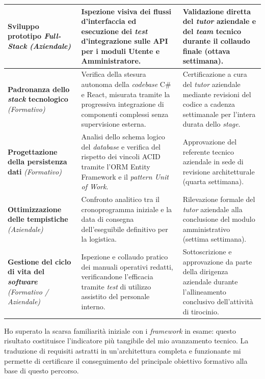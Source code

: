 {\begin{longtable}{p{} p{} p{}}
    \textbf{Sviluppo prototipo \textit{Full-Stack}} \newline \textit{(Aziendale)} & 
    Ispezione visiva dei flussi d'interfaccia ed esecuzione dei \textit{test} d'integrazione sulle API per i moduli Utente e Amministratore. & 
    Validazione diretta del \textit{tutor} aziendale e del \textit{team} tecnico durante il collaudo finale (ottava settimana). \\
    \hline
    \textbf{Padronanza dello \textit{stack} tecnologico} \newline \textit{(Formativo)} & 
    Verifica della stesura autonoma della \textit{codebase} C\# e React, misurata tramite la progressiva integrazione di componenti complessi senza supervisione esterna. & 
    Certificazione a cura del \textit{tutor} aziendale mediante revisioni del codice a cadenza settimanale per l'intera durata dello \textit{stage}. \\
    \hline
    \textbf{Progettazione della persistenza dati} \newline \textit{(Formativo)} & 
    Analisi dello schema logico del \textit{database} e verifica del rispetto dei vincoli ACID tramite l'ORM Entity Framework e il \textit{pattern Unit of Work}. & 
    Approvazione del referente tecnico aziendale in sede di revisione architetturale (quarta settimana). \\
    \hline
    \textbf{Ottimizzazione delle tempistiche} \newline \textit{(Aziendale)} & 
    Confronto analitico tra il cronoprogramma iniziale e la data di consegna dell'eseguibile definitivo per la logistica. & 
    Rilevazione formale del \textit{tutor} aziendale alla conclusione del modulo amministrativo (settima settimana). \\
    \hline
    \textbf{Gestione del ciclo di vita del \textit{software}} \newline \textit{(Formativo / Aziendale)} & 
    Ispezione e collaudo pratico dei manuali operativi redatti, verificandone l'efficacia tramite \textit{test} di utilizzo assistito del personale interno. & 
    Sottoscrizione e approvazione da parte della dirigenza aziendale durante l'allineamento conclusivo dell'attività di tirocinio. \\
\end{longtable}
}
\normalsize

Ho superato la scarsa familiarità iniziale con i \textit{framework} in esame: questo risultato costituisce l'indicatore più tangibile del mio avanzamento tecnico. La traduzione di requisiti astratti in un'architettura completa e funzionante mi permette di certificare il conseguimento del principale obiettivo formativo alla base di questo percorso.

